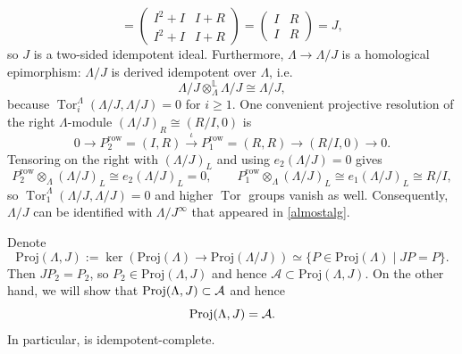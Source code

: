 \documentclass[a4paper,10pt, oneside]{amsart}
\begin{document}
\begin{exam}
\[		=\begin{pmatrix}I^2+I & I+R\\ I^2+I & I+R\end{pmatrix}
		=\begin{pmatrix}I & R\\ I & R\end{pmatrix}=J,
		\]
		so $J$ is a two-sided idempotent ideal. 
		Furthermore, $\Lambda\to \Lambda/J$ is a homological epimorphism: $\Lambda/J$ is derived idempotent over $\Lambda$, i.e.
		\[
		\Lambda/J\otimes^{\mathbb{L}}_{\Lambda}\Lambda/J\cong \Lambda/J,
		\]
		because $\operatorname{Tor}_i^{\Lambda}(\Lambda/J,\Lambda/J)=0$ for $i\geq 1$. One convenient projective resolution of the right $\Lambda$-module $(\Lambda/J)_R\cong (R/I,0)$ is
		\[
		0\longrightarrow P_2^{\mathrm{row}}=(I,R)\xrightarrow{\iota} P_1^{\mathrm{row}}=(R,R)\longrightarrow (R/I,0)\longrightarrow 0.
		\]
		Tensoring on the right with $(\Lambda/J)_L$ and using $e_2(\Lambda/J)=0$ gives
		\[
		P_2^{\mathrm{row}}\otimes_{\Lambda}(\Lambda/J)_L\cong e_2(\Lambda/J)_L=0,\qquad
		P_1^{\mathrm{row}}\otimes_{\Lambda}(\Lambda/J)_L\cong e_1(\Lambda/J)_L\cong R/I,
		\]
		so $\operatorname{Tor}_1^{\Lambda}(\Lambda/J,\Lambda/J)=0$ and higher $\operatorname{Tor}$ groups vanish as well.  Consequently, $\Lambda/J$ can be identified with $\Lambda/J^\infty$ that appeared in \cref{almostalg}.
		
		
		Denote
		\[
		\mathrm{Proj}(\Lambda,J):= \ker(\mathrm{Proj}(\Lambda)\to\mathrm{Proj}(\Lambda/J))\simeq\{P\in \mathrm{Proj}(\Lambda)\mid JP=P\}.
		\]
		Then $JP_2=P_2$, so $P_2\in \mathrm{Proj}(\Lambda,J)$ and hence $\mathcal{A}\subset \mathrm{Proj}(\Lambda,J)$. On the other hand, we will show that $\mathrm{Proj}(\Lambda,J)\subset \mathcal{A}$ and hence $$\mathrm{Proj}(\Lambda,J)=\mathcal{A}.$$ In particular, \mca is idempotent-complete.
		

\end{exam}
\end{document}
